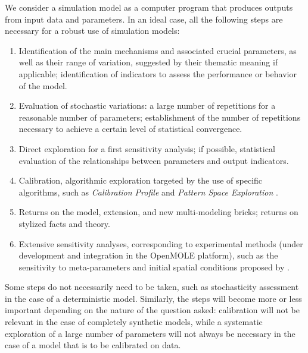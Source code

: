\documentclass[10pt]{article}
\begin{document}
We consider a simulation model as a computer program that produces outputs from input data and parameters. In an ideal case, all the following steps are necessary for a robust use of simulation models:
\begin{enumerate}
	\item Identification of the main mechanisms and associated crucial parameters, as well as their range of variation, suggested by their thematic meaning if applicable; identification of indicators to assess the performance or behavior of the model.
	\item Evaluation of stochastic variations: a large number of repetitions for a reasonable number of parameters; establishment of the number of repetitions necessary to achieve a certain level of statistical convergence.
	\item Direct exploration for a first sensitivity analysis; if possible, statistical evaluation of the relationships between parameters and output indicators.
	\item Calibration, algorithmic exploration targeted by the use of specific algorithms, such as \emph{Calibration Profile} \citep{reuillon2015new} and \emph{Pattern Space Exploration} \citep{10.1371/journal.pone.0138212}.
	\item Returns on the model, extension, and new multi-modeling bricks; returns on stylized facts and theory.
	\item Extensive sensitivity analyses, corresponding to experimental methods (under development and integration in the OpenMOLE platform), such as the sensitivity to meta-parameters and initial spatial conditions proposed by \cite{raimbault2019}.
\end{enumerate}

Some steps do not necessarily need to be taken, such as stochasticity assessment in the case of a deterministic model. Similarly, the steps will become more or less important depending on the nature of the question asked: calibration will not be relevant in the case of completely synthetic models, while a systematic exploration of a large number of parameters will not always be necessary in the case of a model that is to be calibrated on data.
\end{document}
